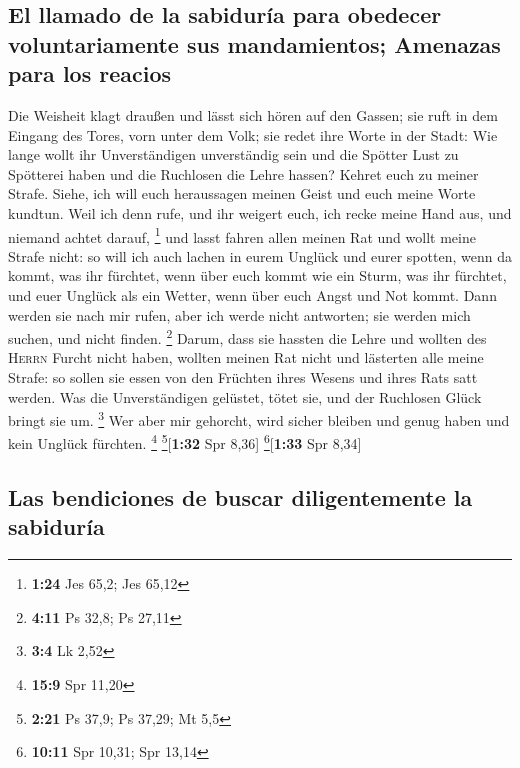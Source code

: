 \hypertarget{el-llamado-de-la-sabiduruxeda-para-obedecer-voluntariamente-sus-mandamientos-amenazas-para-los-reacios}{%
\subsection{El llamado de la sabiduría para obedecer voluntariamente sus
mandamientos; Amenazas para los
reacios}\label{el-llamado-de-la-sabiduruxeda-para-obedecer-voluntariamente-sus-mandamientos-amenazas-para-los-reacios}}

 Die Weisheit klagt draußen und lässt sich hören auf den
Gassen;  sie ruft in dem Eingang des Tores, vorn unter
dem Volk; sie redet ihre Worte in der Stadt:  Wie lange
wollt ihr Unverständigen unverständig sein und die Spötter Lust zu
Spötterei haben und die Ruchlosen die Lehre hassen? 
Kehret euch zu meiner Strafe. Siehe, ich will euch heraussagen meinen
Geist und euch meine Worte kundtun.  Weil ich denn rufe,
und ihr weigert euch, ich recke meine Hand aus, und niemand achtet
darauf, \footnote{\textbf{1:24} Jes 65,2; Jes 65,12}  und
lasst fahren allen meinen Rat und wollt meine Strafe nicht:
 so will ich auch lachen in eurem Unglück und eurer
spotten, wenn da kommt, was ihr fürchtet,  wenn über euch
kommt wie ein Sturm, was ihr fürchtet, und euer Unglück als ein Wetter,
wenn über euch Angst und Not kommt.  Dann werden sie nach
mir rufen, aber ich werde nicht antworten; sie werden mich suchen, und
nicht finden. \footnote{\textbf{4:11} Ps 32,8; Ps 27,11} 
Darum, dass sie hassten die Lehre und wollten des \textsc{Herrn} Furcht
nicht haben,  wollten meinen Rat nicht und lästerten alle
meine Strafe:  so sollen sie essen von den Früchten ihres
Wesens und ihres Rats satt werden.  Was die
Unverständigen gelüstet, tötet sie, und der Ruchlosen Glück bringt sie
um. \footnote{\textbf{3:4} Lk 2,52}  Wer aber mir
gehorcht, wird sicher bleiben und genug haben und kein Unglück fürchten.
\footnote{\textbf{15:9} Spr 11,20} \footnote{\textbf{2:21} Ps 37,9; Ps
  37,29; Mt 5,5}{[}\textbf{1:32} Spr 8,36{]} \footnote{\textbf{10:11}
  Spr 10,31; Spr 13,14}{[}\textbf{1:33} Spr 8,34{]}

\hypertarget{las-bendiciones-de-buscar-diligentemente-la-sabiduruxeda}{%
\subsection{Las bendiciones de buscar diligentemente la
sabiduría}\label{las-bendiciones-de-buscar-diligentemente-la-sabiduruxeda}}

